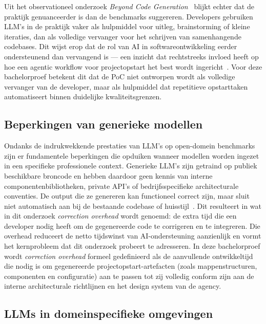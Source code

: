 Uit het observationeel onderzoek \textit{Beyond Code Generation}~\autocite{Sergeyuk2024} blijkt echter dat de praktijk genuanceerder is dan de benchmarks suggereren. Developers gebruiken LLM's in de praktijk vaker als hulpmiddel voor uitleg, brainstorming of kleine iteraties, dan als volledige vervanger voor het schrijven van samenhangende codebases. Dit wijst erop dat de rol van AI in softwareontwikkeling eerder ondersteunend dan vervangend is --- een inzicht dat rechtstreeks invloed heeft op hoe een agentic workflow voor projectopstart het best wordt ingericht~\autocite{Sergeyuk2024}. Voor deze bachelorproef betekent dit dat de PoC niet ontworpen wordt als volledige vervanger van de developer, maar als hulpmiddel dat repetitieve opstarttaken automatiseert binnen duidelijke kwaliteitsgrenzen.

\subsection{Beperkingen van generieke modellen}
\label{subsec:beperkingen-generieke-modellen}

Ondanks de indrukwekkende prestaties van LLM's op open-domein benchmarks zijn er fundamentele beperkingen die opduiken wanneer modellen worden ingezet in een specifieke professionele context. Generieke LLM's zijn getraind op publiek beschikbare broncode en hebben daardoor geen kennis van interne componentenbibliotheken, private API's of bedrijfsspecifieke architecturale conventies. De output die ze genereren kan functioneel correct zijn, maar sluit niet automatisch aan bij de bestaande codebase of huisstijl~\autocite{Veracode2025}. Dit resulteert in wat in dit onderzoek \textit{correction overhead} wordt genoemd: de extra tijd die een developer nodig heeft om de gegenereerde code te corrigeren en te integreren. Die overhead reduceert de netto tijdswinst van AI-ondersteuning aanzienlijk en vormt het kernprobleem dat dit onderzoek probeert te adresseren. In deze bachelorproef wordt \textit{correction overhead} formeel gedefinieerd als de aanvullende ontwikkeltijd die nodig is om gegenereerde projectopstart-artefacten (zoals mappenstructuren, componenten en configuratie) aan te passen tot zij volledig conform zijn aan de interne architecturale richtlijnen en het design system van de agency.

\subsection{LLMs in domeinspecifieke omgevingen}
\label{subsec:llms-domeinspecifiek}

